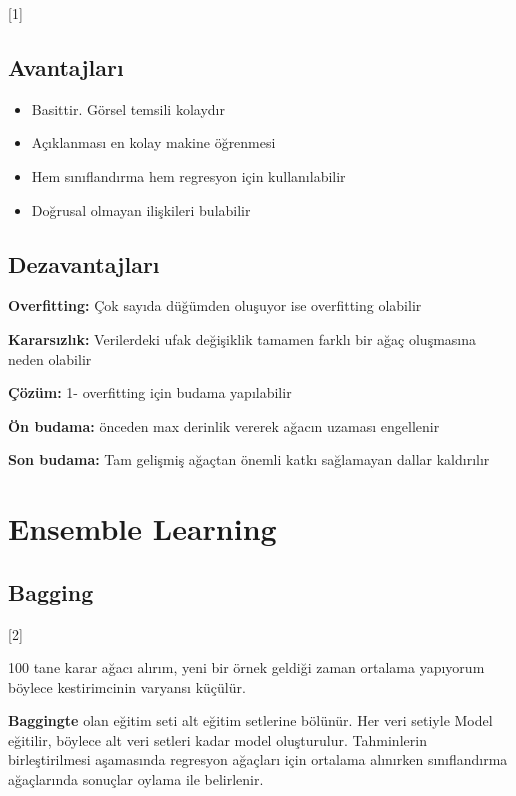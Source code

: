 \documentclass[11pt,a4paper]{article}
\begin{document}
[1]

\subsection{Avantajları}
\begin{itemize}
  \item Basittir. Görsel temsili kolaydır
  \item Açıklanması en kolay makine öğrenmesi
  \item Hem sınıflandırma hem regresyon için kullanılabilir
  \item Doğrusal olmayan ilişkileri bulabilir
\end{itemize}

\subsection{Dezavantajları}

\textbf{Overfitting:} Çok sayıda düğümden oluşuyor ise overfitting olabilir

\textbf{Kararsızlık:} Verilerdeki ufak değişiklik tamamen farklı bir ağaç oluşmasına neden olabilir

\textbf{Çözüm:}
1- overfitting için budama yapılabilir

\textbf{Ön budama:} önceden max derinlik vererek ağacın uzaması engellenir

\textbf{Son budama:} Tam gelişmiş ağaçtan önemli katkı sağlamayan dallar kaldırılır

\section{Ensemble Learning}

\subsection{Bagging}

[2]

100 tane karar ağacı alırım, yeni bir örnek geldiği zaman ortalama yapıyorum böylece kestirimcinin varyansı küçülür.

\textbf{Baggingte} olan eğitim seti alt eğitim setlerine bölünür. Her veri setiyle Model eğitilir, böylece alt veri setleri kadar model oluşturulur. Tahminlerin birleştirilmesi aşamasında regresyon ağaçları için ortalama alınırken sınıflandırma ağaçlarında sonuçlar oylama ile belirlenir.
\end{document}
